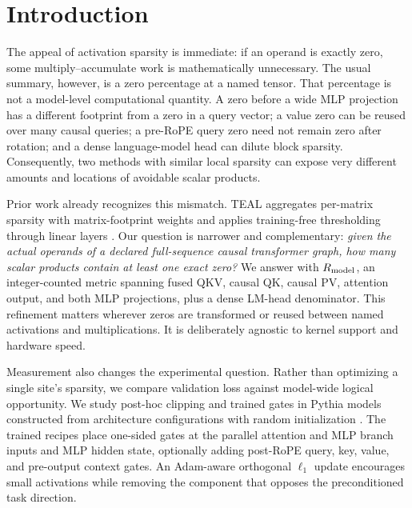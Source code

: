 \section{Introduction}
\label{sec:introduction}

The appeal of activation sparsity is immediate: if an operand is exactly zero,
some multiply--accumulate work is mathematically unnecessary.  The usual
summary, however, is a zero percentage at a named tensor.  That percentage is
not a model-level computational quantity.  A zero before a wide MLP projection
has a different footprint from a zero in a query vector; a value zero can be
reused over many causal queries; a pre-RoPE query zero need not remain zero
after rotation; and a dense language-model head can dilute block sparsity.
Consequently, two methods with similar local sparsity can expose very different
amounts and locations of avoidable scalar products.

Prior work already recognizes this mismatch.  TEAL aggregates per-matrix
sparsity with matrix-footprint weights and applies training-free thresholding
through linear layers \citep{liu2024teal}.  Our question is narrower and
complementary: \emph{given the actual operands of a declared full-sequence
causal transformer graph, how many scalar products contain at least one exact
zero?}  We answer with $R_{\mathrm{model}}$, an integer-counted metric spanning fused QKV,
causal QK, causal PV, attention output, and both MLP projections, plus a dense
LM-head denominator.  This refinement matters wherever zeros are transformed
or reused between named activations and multiplications.  It is deliberately
agnostic to kernel support and hardware speed.

Measurement also changes the experimental question.  Rather than optimizing a
single site's sparsity, we compare validation loss against model-wide logical
opportunity.  We study post-hoc clipping and trained gates in Pythia models
constructed from architecture configurations with random initialization
\citep{biderman2023pythia}.  The trained recipes place one-sided gates at the
parallel attention and MLP branch inputs and MLP hidden state, optionally adding
post-RoPE query, key, value, and pre-output context gates.  An Adam-aware
orthogonal $\ell_1$ update encourages small activations while removing the
component that opposes the preconditioned task direction.

